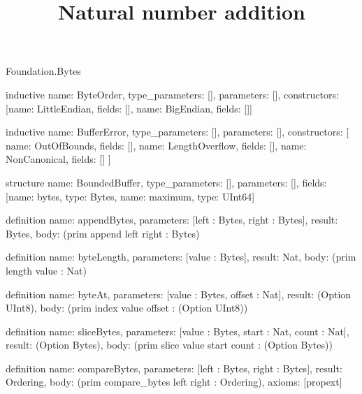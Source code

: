 \begin{lexlean}{Foundation.Bytes}
\title{Natural number addition}
\begin{semanticmodule}
inductive{
  name: ByteOrder,
  type_parameters: [],
  parameters: [],
  constructors: [{name: LittleEndian, fields: []}, {name: BigEndian, fields: []}]
}

inductive{
  name: BufferError,
  type_parameters: [],
  parameters: [],
  constructors: [
    {name: OutOfBounds, fields: []},
    {name: LengthOverflow, fields: []},
    {name: NonCanonical, fields: []}
  ]
}

structure{
  name: BoundedBuffer,
  type_parameters: [],
  parameters: [],
  fields: [{name: bytes, type: Bytes}, {name: maximum, type: UInt64}]
}

definition{
  name: appendBytes,
  parameters: [left : Bytes, right : Bytes],
  result: Bytes,
  body: (prim append left right : Bytes)
}

definition{
  name: byteLength,
  parameters: [value : Bytes],
  result: Nat,
  body: (prim length value : Nat)
}

definition{
  name: byteAt,
  parameters: [value : Bytes, offset : Nat],
  result: (Option UInt8),
  body: (prim index value offset : (Option UInt8))
}

definition{
  name: sliceBytes,
  parameters: [value : Bytes, start : Nat, count : Nat],
  result: (Option Bytes),
  body: (prim slice value start count : (Option Bytes))
}

definition{
  name: compareBytes,
  parameters: [left : Bytes, right : Bytes],
  result: Ordering,
  body: (prim compare_bytes left right : Ordering),
  axioms: [propext]
}
\end{semanticmodule}
\end{lexlean}
